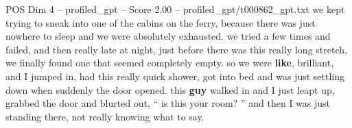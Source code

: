 \begin{textsample}{POS Dim 4 – profiled\_gpt – Score 2.00 – profiled\_gpt/t000862\_gpt.txt}  \label{ex:f4_pos_039}
we kept trying to sneak into one of the cabins on the ferry, because there was just nowhere to sleep and we were absolutely exhausted. we tried a few times and failed, and then really late at night, just before there was this really long stretch, we finally found one that seemed completely empty. so we were \textbf{like}, brilliant, and I jumped in, had this really quick shower, got into bed and was just settling down when suddenly the door opened. this \textbf{guy} walked in and I just leapt up, grabbed the door and blurted out, “ is this your room? ” and then I was just standing there, not really knowing what to say.

\end{textsample}
